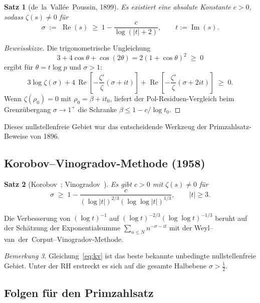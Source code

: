 \documentclass[12pt,a4paper]{article}
\newtheorem{theorem}{Satz}[section]
\theoremstyle{remark}
\newtheorem{bemerkung}[theorem]{Bemerkung}
\begin{document}
\begin{theorem}[de~la~Vallée~Poussin, 1899]\label{thm:dvp}
  Es existiert eine absolute Konstante $c>0$, sodass $\zeta(s)\neq0$ für
  \[
    \sigma \;:=\; \operatorname{Re}(s) \;\geq\; 1 - \frac{c}{\log(|t|+2)},
    \qquad t := \operatorname{Im}(s).
  \]
\end{theorem}

\begin{proof}[Beweisskizze]
  Die trigonometrische Ungleichung
  \[
    3 + 4\cos\theta + \cos(2\theta) = 2(1+\cos\theta)^2 \;\geq\; 0
  \]
  ergibt für $\theta=t\log p$ und $\sigma>1$:
  \[
    3\log\zeta(\sigma) + 4\,\operatorname{Re}\!\left[-\frac{\zeta'}{\zeta}(\sigma+it)\right]
    + \operatorname{Re}\!\left[-\frac{\zeta'}{\zeta}(\sigma+2it)\right] \;\geq\; 0.
  \]
  Wenn $\zeta(\rho_0)=0$ mit $\rho_0=\beta+it_0$, liefert der Pol-Residuen-Vergleich
  beim Grenzübergang $\sigma\to1^+$ die Schranke $\beta\leq1-c/\log t_0$.
\end{proof}

Dieses nullstellenfreie Gebiet war das entscheidende Werkzeug der Primzahlsatz-Beweise von
1896.

\subsection{Korobov--Vinogradov-Methode (1958)}

\begin{theorem}[Korobov~\cite{Korobov1958}; Vinogradov~\cite{Vinogradov1958}]
  Es gibt $c>0$ mit $\zeta(s)\neq0$ für
  \begin{equation}\label{eq:kv}
    \sigma \;\geq\; 1 - \frac{c}{(\log|t|)^{2/3}(\log\log|t|)^{1/3}},
    \qquad |t| \geq 3.
  \end{equation}
\end{theorem}

Die Verbesserung von $(\log t)^{-1}$ auf $(\log t)^{-2/3}(\log\log t)^{-1/3}$ beruht auf
der Schätzung der Exponentialsumme $\sum_{n\leq N}n^{-\sigma-it}$ mit der
Weyl--van~der~Corput--Vinogradov-Methode.

\begin{bemerkung}
  Gleichung~\eqref{eq:kv} ist das beste bekannte unbedingte nullstellenfreie Gebiet.
  Unter der RH erstreckt es sich auf die gesamte Halbebene $\sigma>\tfrac{1}{2}$.
\end{bemerkung}

\subsection{Folgen für den Primzahlsatz}
\end{document}
